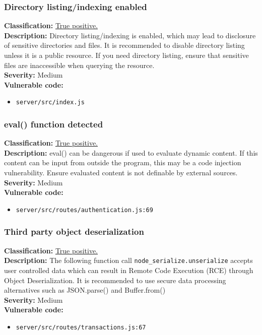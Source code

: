 \documentclass[]{article}
\begin{document}
\subsubsection{Directory listing/indexing enabled}
\textbf{Classification:} \hyperref[subsubsec:exposure_of_information_through_directory_listing]{True positive.} \\
\textbf{Description:} Directory listing/indexing is enabled, which may lead to disclosure of sensitive directories and 
          files. It is recommended to disable directory listing unless it is a public resource. If you need
          directory listing, ensure that sensitive files are inaccessible when querying the resource. \\
\textbf{Severity:}  Medium\\ 
\textbf{Vulnerable code:}
\begin{itemize}
    \item \texttt{server/src/index.js}
\end{itemize}

\subsubsection{eval() function detected}
\textbf{Classification:} \hyperref[subsubsec:improper_neutralization_of_directives_in_dynamically_evaluated_code]{True positive.} \\ 
\textbf{Description:} eval() can be dangerous if used to evaluate dynamic content. If this content can be input from outside the program, this may be a code injection vulnerability. Ensure evaluated content is not definable by external sources. \\ 
\textbf{Severity:} Medium \\ 
\textbf{Vulnerable code:}
\begin{itemize}
    \item \texttt{server/src/routes/authentication.js:69}
\end{itemize}

\subsubsection{Third party object deserialization}
\textbf{Classification:} \hyperref[subsubsec:deserialization_of_untrusted_data]{True positive.} \\
\textbf{Description:} The following function call \texttt{node\_serialize.unserialize} accepts user controlled data which can result in Remote Code Execution (RCE) through Object Deserialization. It is recommended to use secure data processing alternatives such as JSON.parse() and Buffer.from() \\ 
\textbf{Severity:} Medium \\ 
\textbf{Vulnerable code:}
\begin{itemize}
    \item \texttt{server/src/routes/transactions.js:67}
\end{itemize}
\end{document}
